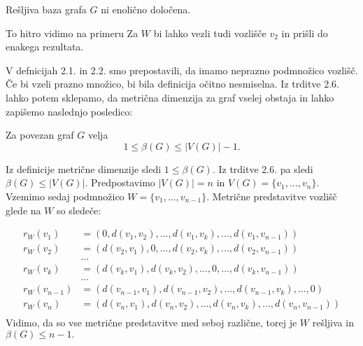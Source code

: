 \documentclass[mat1, tisk]{fmfdelo}
\begin{document}

\begin{trditev}
    Rešljiva baza grafa $G$ ni enolično določena.
\end{trditev}
\begin{dokaz}
    To hitro vidimo na primeru %
    Za $W$ bi lahko vezli tudi vozlišče $v_2$ in prišli do enakega rezultata.
\end{dokaz}

V defnicijah 2.1. in 2.2. smo prepostavili, da imamo neprazno podmnožico vozlišč. Če bi vzeli prazno množico,
bi bila definicija očitno nesmiselna. Iz trditve 2.6. lahko potem sklepamo, da metrična dimenzija za graf vselej 
obstaja in lahko zapišemo naslednjo posledico:

\begin{posledica}
    Za povezan graf $G$ velja
    $$1 \leq \beta(G) \leq |V(G)| - 1. $$
\end{posledica}
\begin{dokaz}
    Iz definicije metrične dimenzije sledi $1 \leq \beta(G)$. Iz trditve 2.6. pa sledi $\beta(G) \leq |V(G)|.$
    Predpostavimo $|V(G)| = n$ in $V(G) = \{ v_1, ... , v_n\}$. Vzemimo sedaj podmnožico $W = \{ v_1, ... , v_{n-1}\}.$
    Metrične predstavitve vozlišč glede na $W$ so sledeče:

    \begin{align*}
        r_W(v_1) & = (0, d(v_1, v_2), ..., d(v_1, v_k), ... , d(v_1, v_{n-1})) \\
        r_W(v_2) & = (d(v_2, v_1), 0, ..., d(v_2, v_k), ... , d(v_2, v_{n-1})) \\
        & \dots \\
        r_W(v_k) & = (d(v_k, v_1), d(v_k, v_2), ..., 0 , ... , d(v_k, v_{n-1})) \\
        & \dots \\
        r_W(v_{n-1}) & = (d(v_{n-1}, v_1), d(v_{n-1}, v_2), ... , d(v_{n-1}, v_k) , ..., 0) \\
        r_W(v_n) & = (d(v_n, v_1), d(v_n, v_2), ...,  d(v_n, v_k), ... , d(v_n, v_{n-1})) \\
    \end{align*}
    Vidimo, da so vse metrične predstavitve med seboj različne, torej je $W$ rešljiva in $\beta(G) \leq n - 1.$ 




\end{dokaz}
\end{document}
